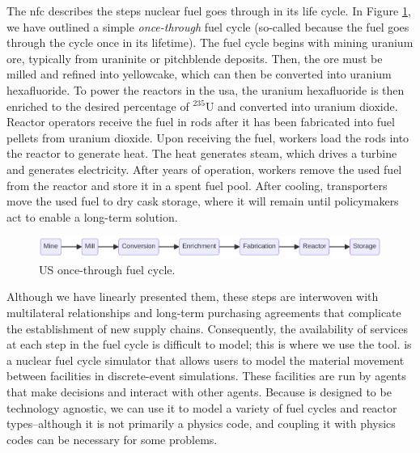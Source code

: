 The \gls{nfc} describes the steps nuclear fuel goes through
in its life cycle. In Figure \ref{fig:once-through}, we have outlined a
simple \textit{once-through} fuel cycle (so-called because the fuel goes through
the cycle once in its lifetime). The fuel cycle begins with mining uranium ore,
typically from uraninite or pitchblende deposits. Then, the ore must be milled
and refined into yellowcake, which can then be converted into uranium
hexafluoride. To power the reactors in the \gls{usa}, the uranium hexafluoride
is then enriched to the desired percentage of $^{235}$U and converted
into uranium dioxide. Reactor operators receive the fuel in rods after it has
been fabricated into fuel pellets from uranium dioxide. Upon receiving the
fuel, workers load the rods into the reactor to generate heat. The heat
generates steam, which drives a turbine and generates electricity. After years
of operation, workers remove the used fuel from the reactor and store it in a
spent fuel pool. After cooling, transporters move the used
fuel to dry cask storage, where it will remain until policymakers act to enable
a long-term solution.

\begin{figure}[H]
    \centering
    \includegraphics[scale=0.40]{images/once_through_fc.png}
    \caption{US once-through fuel cycle.}
    \label{fig:once-through}
\end{figure}

Although we have linearly presented them, these steps are interwoven with
multilateral relationships and long-term purchasing agreements that complicate
the establishment of new supply chains. Consequently, the availability of
services at each step in the fuel cycle is difficult to model; this is where we
use the \cyclus \cite{huff_cyclus_intro_2016} tool. \cyclus is a
nuclear fuel cycle simulator that allows users to model the material movement between facilities in discrete-event simulations. These facilities
are run by agents that make decisions and interact with other agents. Because
\cyclus is designed to be technology agnostic, we can use it to model a variety
of fuel cycles and reactor types--although it is not primarily a physics code,
and coupling it with physics codes can be necessary for some problems.


